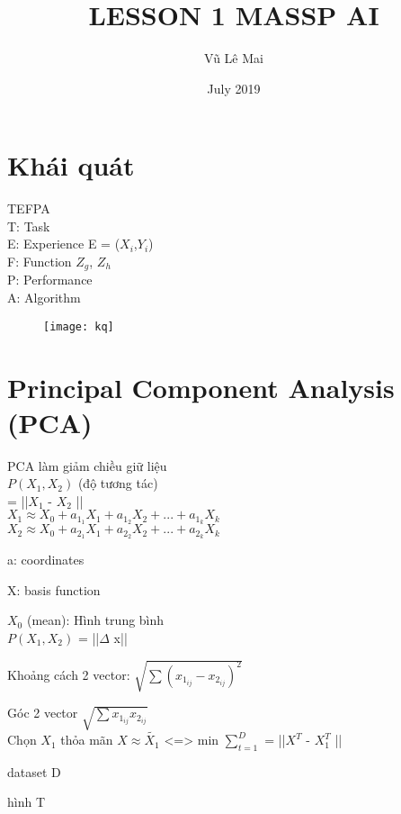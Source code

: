 \documentclass{article}
\title{LESSON 1 MASSP AI}
\author{Vũ Lê Mai}
\date{July 2019}
\begin{document}
    \maketitle
\section{Khái quát}
    TEFPA\\
    T: Task\\
    E: Experience  E = ({$X_{i}$,$Y_{i}$})\\
    F: Function $Z_{g}$, $Z_{h}$\\
    P: Performance\\
    A: Algorithm\\
\begin{figure}[h!]
\centering
\texttt{[image: kq]}
\label{fig:kq}
\end{figure}
\section{Principal Component Analysis (PCA)}
    PCA làm giảm chiều giữ liệu\\
    $P(X_{1}, X_{2})$ (độ tương tác) \\
    = ||$X_{1}$ - $X_{2}$ || \\
    $X_{1} \approx X_{0} + a_{1_{1}}X_{1} + a_{1_{2}}X_{2} + ... + a_{1_{k}}X_{k}$\\
    $X_{2} \approx X_{0} + a_{2_{1}}X_{1} + a_{2_{2}}X_{2} + ... + a_{2_{k}}X_{k} $

    a: coordinates

    X: basis function

    $X_{0}$ (mean): Hình trung bình\\
    $P(X_{1}, X_{2})$ = ||$\Delta$ x||

    Khoảng cách 2 vector: $\sqrt{\sum \left ( x_{1_{ij}} - x_{2_{ij}}\right )^{2}}$

    Góc 2 vector $\sqrt{\sum x_{1_{ij}} x_{2_{ij}}} $\\
    Chọn $X_{1}$ thỏa mãn $X \approx \tilde{X_{1}}$
    <=> min $\sum_{t=1}^{D}$ = ||$X^{T}$ - $X^{T}_{1}$ ||

    dataset D

    hình T
\end{document}

